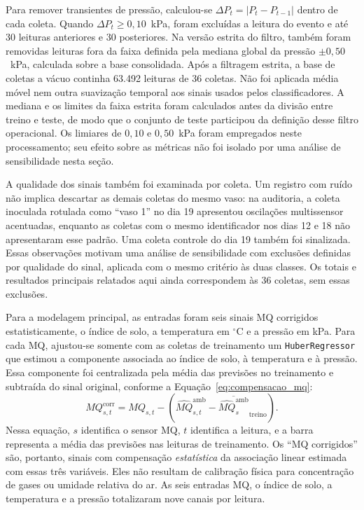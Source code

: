 Para remover transientes de pressão, calculou-se
$\Delta P_t=|P_t-P_{t-1}|$ dentro de cada coleta. Quando
$\Delta P_t\geq 0{,}10$~kPa, foram excluídas a leitura do evento e até
30 leituras anteriores e 30 posteriores. Na versão estrita do filtro,
também foram removidas leituras fora da faixa definida pela mediana global
da pressão $\pm 0{,}50$~kPa, calculada sobre a base consolidada. Após a
filtragem estrita, a base de coletas a vácuo continha 63.492 leituras de
36 coletas. Não foi aplicada média móvel nem outra suavização temporal
aos sinais usados pelos classificadores.
A mediana e os limites da faixa estrita foram calculados antes da divisão
entre treino e teste, de modo que o conjunto de teste participou da
definição desse filtro operacional. Os limiares de $0{,}10$ e $0{,}50$~kPa
foram empregados neste processamento; seu efeito sobre as métricas não
foi isolado por uma análise de sensibilidade nesta seção.

A qualidade dos sinais também foi examinada por coleta. Um registro com
ruído não implica descartar as demais coletas do mesmo vaso: na auditoria,
a coleta inoculada rotulada como ``vaso 1'' no dia 19 apresentou oscilações
multissensor acentuadas, enquanto as coletas com o mesmo identificador nos
dias 12 e 18 não apresentaram esse padrão. Uma coleta controle do dia 19
também foi sinalizada. Essas observações motivam uma análise de sensibilidade
com exclusões definidas por qualidade do sinal, aplicada com o mesmo critério
às duas classes. Os totais e resultados principais relatados aqui ainda
correspondem às 36 coletas, sem essas exclusões.

Para a modelagem principal, as entradas foram seis sinais MQ corrigidos
estatisticamente, o índice de solo, a temperatura em $^{\circ}$C e a
pressão em kPa. Para cada MQ, ajustou-se somente com as coletas de
treinamento um \texttt{HuberRegressor} que estimou a componente associada
ao índice de solo, à temperatura e à pressão. Essa componente foi
centralizada pela média das previsões no treinamento e subtraída do
sinal original, conforme a Equação~\eqref{eq:compensacao_mq}:
\begin{equation}
    \label{eq:compensacao_mq}
    MQ_{s,t}^{\mathrm{corr}} = MQ_{s,t} -
    \left(\widehat{MQ}_{s,t}^{\mathrm{amb}}-
    \overline{\widehat{MQ}_{s}^{\mathrm{amb}}}_{\mathrm{treino}}\right).
\end{equation}
Nessa equação, $s$ identifica o sensor MQ, $t$ identifica a leitura, e a
barra representa a média das previsões nas leituras de treinamento. Os
``MQ corrigidos'' são, portanto, sinais com compensação \emph{estatística}
da associação linear estimada com essas três variáveis. Eles não resultam
de calibração física para concentração de gases ou umidade relativa do ar.
As seis entradas MQ, o índice de solo, a temperatura e a pressão totalizaram
nove canais por leitura.

